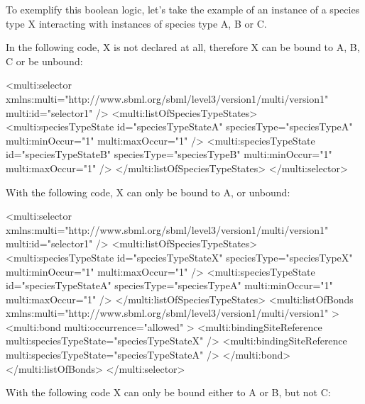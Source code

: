 To exemplify this boolean logic, let's take the example of an instance of a species type X interacting with instances of species type A, B or C.

In the following code, X is not declared at all, therefore X can be bound to A, B, C or be unbound:

\begin{example}
<multi:selector xmlns:multi="http://www.sbml.org/sbml/level3/version1/multi/version1" 
                multi:id="selector1" />
  <multi:listOfSpeciesTypeStates>
    <multi:speciesTypeState id="speciesTypeStateA" speciesType="speciesTypeA"                                           
                            multi:minOccur="1" multi:maxOccur="1" />
    <multi:speciesTypeState id="speciesTypeStateB" speciesType="speciesTypeB"                           
                            multi:minOccur="1" multi:maxOccur="1" />
  </multi:listOfSpeciesTypeStates>
</multi:selector> 
\end{example}

With the following code, X can only be bound to A, or unbound:

\begin{example}
<multi:selector xmlns:multi="http://www.sbml.org/sbml/level3/version1/multi/version1" 
                multi:id="selector1" />
  <multi:listOfSpeciesTypeStates>
    <multi:speciesTypeState id="speciesTypeStateX" speciesType="speciesTypeX"                                           
                            multi:minOccur="1" multi:maxOccur="1" />
    <multi:speciesTypeState id="speciesTypeStateA" speciesType="speciesTypeA"                           
                            multi:minOccur="1" multi:maxOccur="1" />
  </multi:listOfSpeciesTypeStates>
  <multi:listOfBonds xmlns:multi="http://www.sbml.org/sbml/level3/version1/multi/version1" >
    <multi:bond multi:occurrence="allowed" >
      <multi:bindingSiteReference multi:speciesTypeState="speciesTypeStateX" />
      <multi:bindingSiteReference multi:speciesTypeState="speciesTypeStateA" />
    </multi:bond>
  </multi:listOfBonds>
</multi:selector> 
\end{example}

With the following code X can only be bound either to A or B, but not C:

